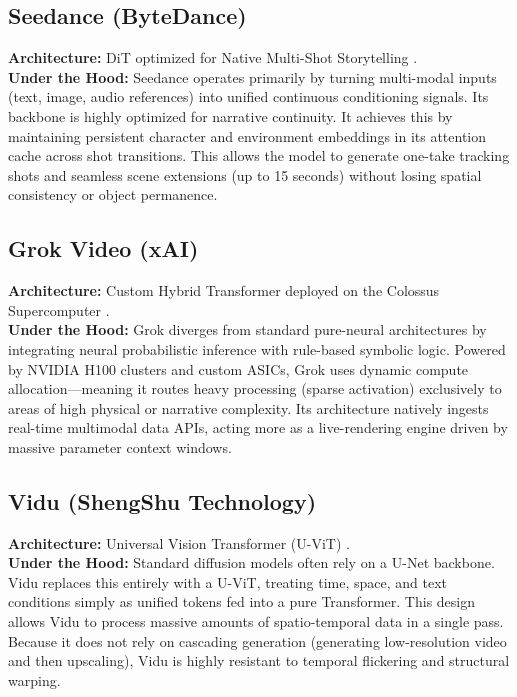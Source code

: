 \documentclass[sigconf]{acmart}
\begin{document}
\subsection{Seedance (ByteDance)}
\textbf{Architecture:} DiT optimized for Native Multi-Shot Storytelling \cite{bytedance2025seedance}. \\
\textbf{Under the Hood:} Seedance operates primarily by turning multi-modal inputs (text, image, audio references) into unified continuous conditioning signals. Its backbone is highly optimized for narrative continuity. It achieves this by maintaining persistent character and environment embeddings in its attention cache across shot transitions. This allows the model to generate one-take tracking shots and seamless scene extensions (up to 15 seconds) without losing spatial consistency or object permanence.

\subsection{Grok Video (xAI)}
\textbf{Architecture:} Custom Hybrid Transformer deployed on the Colossus Supercomputer \cite{xai2025grok}. \\
\textbf{Under the Hood:} Grok diverges from standard pure-neural architectures by integrating neural probabilistic inference with rule-based symbolic logic. Powered by NVIDIA H100 clusters and custom ASICs, Grok uses dynamic compute allocation—meaning it routes heavy processing (sparse activation) exclusively to areas of high physical or narrative complexity. Its architecture natively ingests real-time multimodal data APIs, acting more as a live-rendering engine driven by massive parameter context windows.

\subsection{Vidu (ShengShu Technology)}
\textbf{Architecture:} Universal Vision Transformer (U-ViT) \cite{bao2023all, shengshu2024vidu}. \\
\textbf{Under the Hood:} Standard diffusion models often rely on a U-Net backbone. Vidu replaces this entirely with a U-ViT, treating time, space, and text conditions simply as unified tokens fed into a pure Transformer. This design allows Vidu to process massive amounts of spatio-temporal data in a single pass. Because it does not rely on cascading generation (generating low-resolution video and then upscaling), Vidu is highly resistant to temporal flickering and structural warping.
\end{document}
